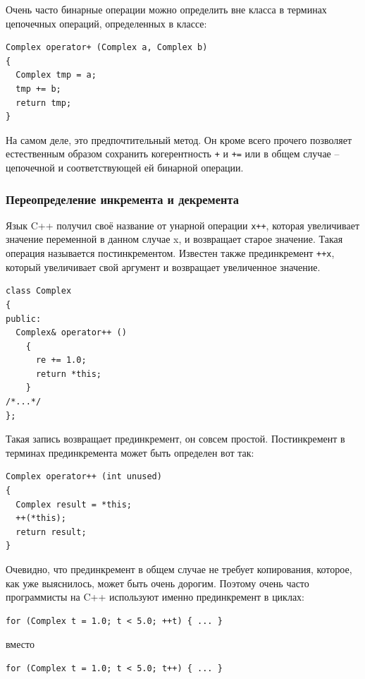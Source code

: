 \documentclass[a4paper,12pt,oneside]{article}
\begin{document}
Очень часто бинарные операции можно определить вне класса в терминах цепочечных операций, определенных в классе:

\begin{lstlisting}
Complex operator+ (Complex a, Complex b)
{
  Complex tmp = a;
  tmp += b;
  return tmp;
}
\end{lstlisting}

На самом деле, это предпочтительный метод. Он кроме всего прочего позволяет естественным образом сохранить когерентность \lstinline!+! и \lstinline!+=! или в общем случае -- цепочечной и соответствующей ей бинарной операции.

\subsubsection{Переопределение инкремента и декремента}\label{IncrOverload}

Язык C++ получил своё название от унарной операции \lstinline!x++!, которая увеличивает значение переменной в данном случае x, и возвращает старое значение. Такая операция называется постинкрементом. Известен также прединкремент \lstinline!++x!, который увеличивает свой аргумент и возвращает увеличенное значение.

\begin{lstlisting}
class Complex
{
public:
  Complex& operator++ ()
    {
      re += 1.0;
      return *this;      
    }
/*...*/
};
\end{lstlisting}

Такая запись возвращает прединкремент, он совсем простой. Постинкремент в терминах прединкремента может быть определен вот так:

\begin{lstlisting}
Complex operator++ (int unused)
{
  Complex result = *this;
  ++(*this);
  return result;
} 
\end{lstlisting}

Очевидно, что прединкремент в общем случае не требует копирования, которое, как уже выяснилось, может быть очень дорогим. Поэтому очень часто программисты на C++ используют именно прединкремент в циклах:

\begin{lstlisting}
for (Complex t = 1.0; t < 5.0; ++t) { ... }
\end{lstlisting}

вместо

\begin{lstlisting}
for (Complex t = 1.0; t < 5.0; t++) { ... }
\end{lstlisting}
\end{document}
